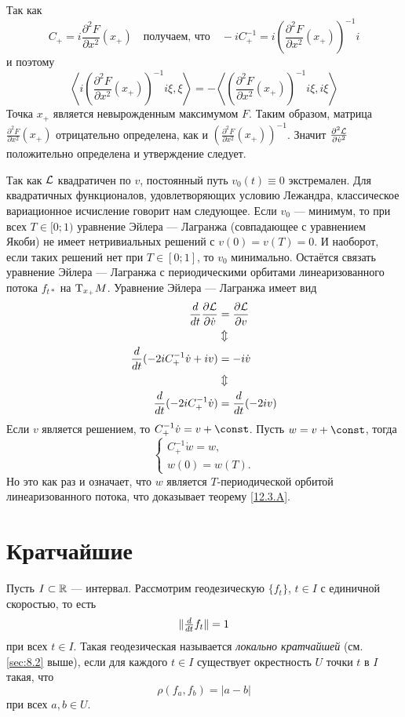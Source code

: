 Так как 
\[C_+=i\frac{\partial^2F}{\partial x^2}(x_+)
\quad\text{получаем, что}\quad
-iC_+^{-1}=i\left(\frac{\partial^2F}{\partial x^2}(x_+)\right)^{-1}i\]
и поэтому 
\[
\left\langle i\left(\frac{\partial^2F}{\partial x^2}(x_+)\right)^{-1}i\xi,\xi\right\rangle
=
-\left\langle \left(\frac{\partial^2F}{\partial x^2}(x_+)\right)^{-1}i\xi,i\xi\right\rangle
\]
Точка $x_+$ является невырожденным максимумом $F$.
Таким образом, матрица $\frac{\partial^2F}{\partial x^2}(x_+)$
отрицательно определена, как и $\left(\frac{\partial^2F}{\partial x^2}(x_+)\right)^{-1}$.
Значит $\tfrac{\partial^2\mathcal{L}}{\partial\dot v^2}$ положительно определена и утверждение следует.

Так как $\mathcal{L}$ квадратичен по $v$, постоянный путь $v_0(t) \equiv 0$ экстремален.
Для квадратичных функционалов, удовлетворяющих условию Лежандра, классическое вариационное исчисление говорит нам следующее.
Если $v_0$ — минимум, то при всех $T \in [0;1)$ уравнение Эйлера — Лагранжа (совпадающее с уравнением Якоби) не имеет нетривиальных решений с $v(0) = v(T) = 0$.
И наоборот, если таких решений нет при $T\in[0;1]$, то $v_0$ минимально.
Остаётся связать уравнение Эйлера — Лагранжа с периодическими орбитами линеаризованного потока $f_{t*}$ на $\mathrm{T}_{x_+}M$.
Уравнение Эйлера — Лагранжа имеет вид
\begin{align*}
\frac{d}{d t}\frac{\partial \mathcal{L}}{\partial \dot v}
&=\frac{\partial \mathcal{L}}{\partial v}
\\
&\Updownarrow
\\
\frac{d}{d t}(-2iC_+^{-1}\dot v+iv)
&=-i\dot v
\\
&\Updownarrow
\\
\frac{d}{d t}(-2iC_+^{-1}\dot v)
&=
\frac{d}{d t}(-2iv)
\end{align*}
Если $v$ является решением, то $C_+^{-1}\dot v = v + \const$.
Пусть $w = v + \const$, тогда 
\[
\begin{cases}
C_+^{-1}\dot w=w,
\\
w(0)=w(T).
\end{cases}
\]
Но это как раз и означает, что $w$ является $T$-периодической орбитой линеаризованного потока, что доказывает теорему \ref{12.3.A}.
\qeds


\section{Кратчайшие}
Пусть $I \subset \mathbb{R}$ — интервал.
Рассмотрим геодезическую $\{f_t\}$, $t\in I$ с единичной скоростью, то есть
\[\|\tfrac{d}{d t}f_t\|=1\]
при всех $t\in I$.
Такая геодезическая называется \emph{локально кратчайшей} (см. \ref{sec:8.2} выше), если для каждого $t\in I$ существует окрестность $U$ точки $t$ в $I$ такая, что 
\[\rho(f_a,f_b)=|a-b|\]
при всех $a,b\in U$.

